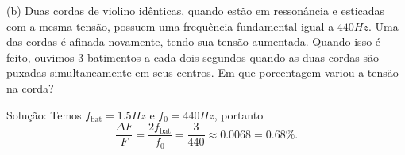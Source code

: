 \documentclass[a4paper,10pt]{article}
\newcommand{\fbat}{f_{\text{bat}}}
\begin{document}
\n

(b) Duas cordas de violino idênticas, quando estão em ressonância e esticadas com
a mesma tensão, possuem uma frequência fundamental igual a $440 \unit{Hz}$. Uma
das cordas é afinada novamente, tendo sua tensão aumentada. Quando isso é
feito, ouvimos $3$ batimentos a cada dois segundos quando as duas cordas são puxadas
simultaneamente em seus centros. Em que porcentagem variou a tensão na corda?

\n

Solução: Temos $\fbat = 1.5 \unit{Hz}$ e $f_0 = 440 \unit{Hz}$, portanto
$$
\frac{\Delta F}{F} = \frac{2 \fbat}{f_0} = \frac{3}{440} \approx 0.0068 = 0.68\%.
$$
\end{document}

